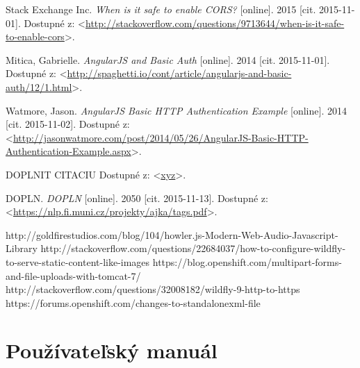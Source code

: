 \documentclass[12pt,oneside]{fithesis2}
\begin{document}
\begin{thebibliography}{59}
  		Stack Exchange Inc.
  		\emph{When is it safe to enable CORS?}
  		[online].
  		2015
  		[cit. 2015-11-01].
  		Dostupné z: <\url{http://stackoverflow.com/questions/9713644/when-is-it-safe-to-enable-cors}>.
  		
  		Mitica, Gabrielle.
  		\emph{AngularJS and Basic Auth}
  		[online].
  		2014
  		[cit. 2015-11-01].
  		Dostupné z: <\url{http://spaghetti.io/cont/article/angularjs-and-basic-auth/12/1.html}>.
  		
  		Watmore, Jason.
  		\emph{AngularJS Basic HTTP Authentication Example}
  		[online].
  		2014
  		[cit. 2015-11-02].
  		Dostupné z: <\url{http://jasonwatmore.com/post/2014/05/26/AngularJS-Basic-HTTP-Authentication-Example.aspx}>.
  		
		DOPLNIT CITACIU
  		Dostupné z: <\url{xyz}>.
  		
  		DOPLN.
  		\emph{DOPLN}
  		[online].
  		2050
  		[cit. 2015-11-13].
  		Dostupné z: <\url{https://nlp.fi.muni.cz/projekty/ajka/tags.pdf}>.
  		
  		http://goldfirestudios.com/blog/104/howler.js-Modern-Web-Audio-Javascript-Library
  		http://stackoverflow.com/questions/22684037/how-to-configure-wildfly-to-serve-static-content-like-images
  		https://blog.openshift.com/multipart-forms-and-file-uploads-with-tomcat-7/
  		http://stackoverflow.com/questions/32008182/wildfly-9-http-to-https
  		https://forums.openshift.com/changes-to-standalonexml-file
  		
  		  			
	\end{thebibliography} 
	
    \appendix
    \chapter{Používateľský manuál} 	  %
\end{document}
